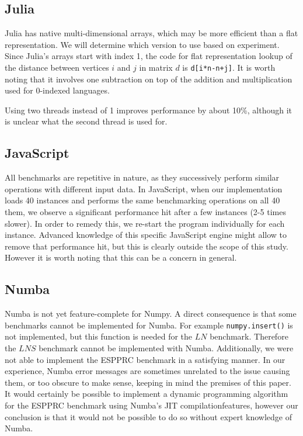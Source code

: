 \documentclass[11pt,a4paper,notitlepage]{article}
\begin{document}
\subsection{Julia}
Julia has native multi-dimensional arrays, which may be more efficient
than a flat representation. We will determine which version to use
based on experiment. Since Julia's arrays start with index 1, the code
for flat representation lookup of the distance between vertices $i$
and $j$ in matrix $d$ is \lstinline{d[i*n-n+j]}. It is worth noting
that it involves one subtraction on top of the addition and
multiplication used for 0-indexed languages.


Using two threads instead of 1 improves performance by about 10\%,
although it is unclear what the second thread is used for.


\subsection{JavaScript}
All benchmarks are repetitive in nature, as they successively perform similar
operations with different input data. In JavaScript, when our
implementation loads 40 instances and performs the same
benchmarking operations on all 40 them, we observe a significant performance
hit after a few instances (2-5 times slower). In order to remedy this,
we re-start the program individually for each instance. Advanced
knowledge of this specific JavaScript engine might allow to remove that
performance hit, but this is clearly outside the scope of this
study. However it is worth noting that this can be a concern in general.

\subsection{Numba}
Numba is not yet feature-complete for Numpy. A direct consequence is that some
benchmarks cannot be implemented for Numba. For example
\lstinline{numpy.insert()} is not implemented, but this function is
needed for the $LN$ benchmark. Therefore the $LNS$ benchmark cannot be
implemented with Numba. Additionally, we were not able to implement
the ESPPRC benchmark in a satisfying manner. In our experience, Numba
error messages are sometimes unrelated to the issue causing them, or
too obscure to make sense, keeping in mind the premises of this
paper. It would certainly be possible to implement a dynamic
programming algorithm for the ESPPRC benchmark using Numba's JIT
compilationfeatures, however our conclusion is that it would not be
possible to do so without expert knowledge of Numba.
\end{document}
